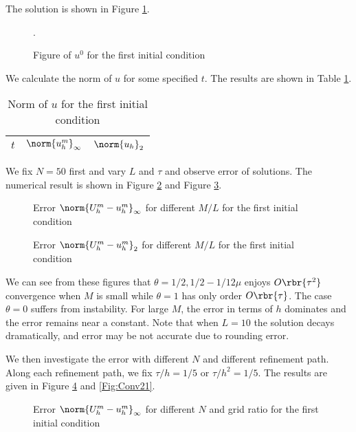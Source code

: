 \documentclass[english, nochinese]{pnote}
\begin{document}
The solution is shown in Figure \ref{Fig:Sol1}.

\begin{figure}[htbp]
\centering

\caption{Figure of $u^0$ for the first initial condition}.
\label{Fig:Sol1}
\end{figure}

We calculate the norm of $u$ for some specified $t$. The results are shown in Table \ref{Tbl:Decay1}.

\begin{table}[htbp]
\centering
\begin{tabular}{|c|c|c|}
\hline
$t$ & $\norm{u_h^m}_{\infty}$ & $\norm{u_h}_2$ \\
\hline

\end{tabular}
\caption{Norm of $u$ for the first initial condition}
\label{Tbl:Decay1}
\end{table}

We fix $ N = 50 $ first and vary $L$ and $\tau$ and observe error of solutions. The numerical result is shown in Figure \ref{Fig:ErrI1} and Figure \ref{Fig:Err21}.

\begin{figure}
\centering
\scalebox{0.75}{}
\caption{Error $ \norm{ U_h^m - u_h^m }_{\infty} $ for different $ M / L $ for the first initial condition}
\label{Fig:ErrI1}
\end{figure}

\begin{figure}
\centering
\scalebox{0.75}{}
\caption{Error $ \norm{ U_h^m - u_h^m }_2 $ for different $ M / L $ for the first initial condition}
\label{Fig:Err21}
\end{figure}

We can see from these figures that $ \theta = 1 / 2, 1 / 2 - 1 / 12 \mu $ enjoys $ O \rbr{\tau^2} $ convergence when $M$ is small while $ \theta = 1 $ has only order $ O \rbr{\tau} $. The case $ \theta = 0 $ suffers from instability. For large $M$, the error in terms of $h$ dominates and the error remains near a constant. Note that when $ L = 10 $ the solution decays dramatically, and error may be not accurate due to rounding error.

We then investigate the error with different $N$ and different refinement path. Along each refinement path, we fix $ \tau / h = 1 / 5 $ or $ \tau / h^2 = 1 / 5 $. The results are given in Figure \ref{Fig:ConvI1} and \ref{Fig:Conv21}. 

\begin{figure}
\centering
\scalebox{0.75}{}
\caption{Error $ \norm{ U_h^m - u_h^m }_{\infty} $ for different $N$ and grid ratio for the first initial condition}
\label{Fig:ConvI1}
\end{figure}
\end{document}
